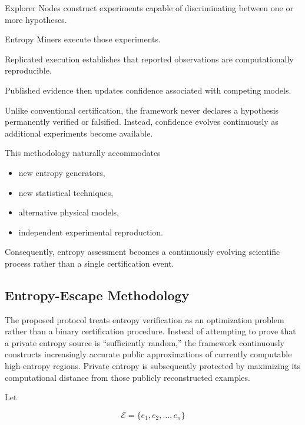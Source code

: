 \documentclass[11pt]{article}
\begin{document}
Explorer Nodes construct experiments
capable of discriminating between one or more hypotheses.

Entropy Miners execute those experiments.

Replicated execution establishes
that reported observations
are computationally reproducible.

Published evidence then updates confidence
associated with competing models.

Unlike conventional certification,
the framework never declares
a hypothesis permanently verified or falsified.
Instead,
confidence evolves continuously
as additional experiments become available.

This methodology naturally accommodates

\begin{itemize}

\item
new entropy generators,

\item
new statistical techniques,

\item
alternative physical models,

\item
independent experimental reproduction.

\end{itemize}

Consequently,
entropy assessment becomes
a continuously evolving scientific process
rather than a single certification event.


\subsection{Entropy-Escape Methodology}

The proposed protocol treats entropy verification as an optimization
problem rather than a binary certification procedure.
Instead of attempting to prove that a private entropy source is
``sufficiently random,''
the framework continuously constructs increasingly accurate public approximations of currently computable high-entropy regions.
Private entropy is subsequently protected by maximizing its
computational distance from those publicly reconstructed examples.

Let

\[
\mathcal{E}
=
\{e_1,e_2,\ldots,e_n\}
\]
\end{document}
